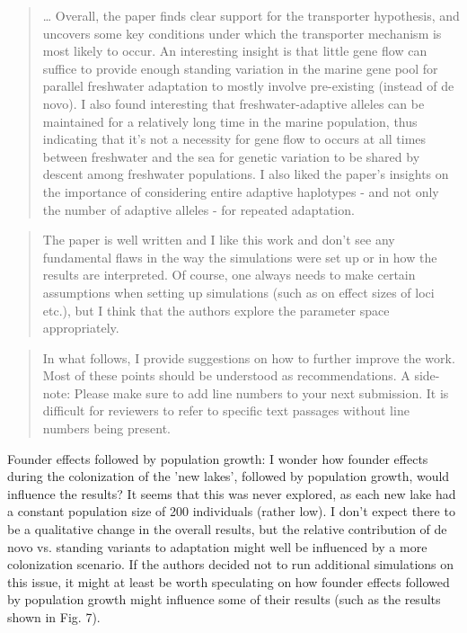 




\begin{quote}
    \ldots
    Overall, the paper finds clear support for the transporter hypothesis, and
    uncovers some key conditions under which the transporter mechanism is most
    likely to occur. An interesting insight is that little gene flow can suffice to
    provide enough standing variation in the marine gene pool for parallel
    freshwater adaptation to mostly involve pre-existing (instead of de novo). I
    also found interesting that freshwater-adaptive alleles can be maintained for a
    relatively long time in the marine population, thus indicating that it's not a
    necessity for gene flow to occurs at all times between freshwater and the sea
    for genetic variation to be shared by descent among freshwater populations. I
    also liked the paper's insights on the importance of considering entire
    adaptive haplotypes - and not only the number of adaptive alleles - for
    repeated adaptation.  
\end{quote}

\begin{quote}
    The paper is well written and I like this work and don't see any
    fundamental flaws in the way the simulations were set up or in how the results
    are interpreted. Of course, one always needs to make certain assumptions when
    setting up simulations (such as on effect sizes of loci etc.), but I think that
    the authors explore the parameter space appropriately. 
\end{quote}

\begin{quote}
    In what follows, I provide suggestions on how to further improve the work. Most
    of these points should be understood as recommendations. A side-note:
    Please make sure to add line numbers to your next submission. It is
    difficult for reviewers to refer to specific text passages without line
    numbers being present.
\end{quote}

\begin{point}{}
Founder effects followed by population growth: I wonder how founder effects during the colonization of the 'new lakes', followed by population growth, would influence the results? It seems that this was never explored, as each new lake had a constant population size of 200 individuals (rather low). I don't expect there to be a qualitative change in the overall results, but the relative contribution of de novo vs. standing variants to adaptation might well be influenced by a more colonization scenario. If the authors decided not to run additional simulations on this issue, it might at least be worth speculating on how founder effects followed by population growth might influence some of their results (such as the results shown in Fig. 7).
\end{point}


